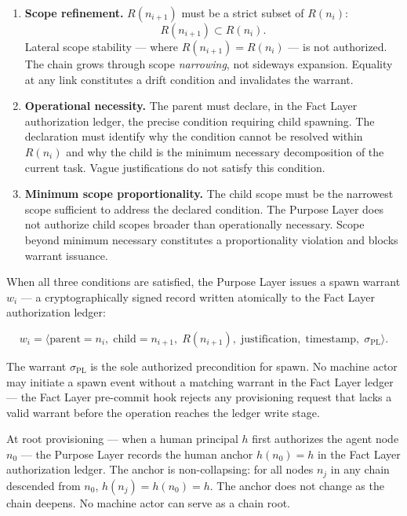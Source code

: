 \begin{enumerate}
    \item[(P1)] \textbf{Scope refinement.} $R(n_{i+1})$ must be a strict subset of $R(n_i)$:
    \begin{equation}
    R(n_{i+1}) \subset R(n_i).
    \label{eq:rs-scope-refinement}
    \end{equation}
    Lateral scope stability — where $R(n_{i+1}) = R(n_i)$ — is not authorized. The chain grows through scope \emph{narrowing}, not sideways expansion. Equality at any link constitutes a drift condition and invalidates the warrant.

    \item[(P2)] \textbf{Operational necessity.} The parent must declare, in the Fact Layer authorization ledger, the precise condition requiring child spawning. The declaration must identify why the condition cannot be resolved within $R(n_i)$ and why the child is the minimum necessary decomposition of the current task. Vague justifications do not satisfy this condition.

    \item[(P3)] \textbf{Minimum scope proportionality.} The child scope must be the narrowest scope sufficient to address the declared condition. The Purpose Layer does not authorize child scopes broader than operationally necessary. Scope beyond minimum necessary constitutes a proportionality violation and blocks warrant issuance.
\end{enumerate}

When all three conditions are satisfied, the Purpose Layer issues a spawn warrant $w_i$ — a cryptographically signed record written atomically to the Fact Layer authorization ledger:

\begin{equation}
w_i = \bigl\langle
\text{parent}=n_i,\;
\text{child}=n_{i+1},\;
R(n_{i+1}),\;
\text{justification},\;
\text{timestamp},\;
\sigma_{\text{PL}}
\bigr\rangle .
\label{eq:spawn-warrant}
\end{equation}

The warrant $\sigma_{\text{PL}}$ is the sole authorized precondition for spawn. No machine actor may initiate a spawn event without a matching warrant in the Fact Layer ledger — the Fact Layer pre-commit hook rejects any provisioning request that lacks a valid warrant before the operation reaches the ledger write stage.

At root provisioning — when a human principal $h$ first authorizes the agent node $n_0$ — the Purpose Layer records the human anchor $h(n_0) = h$ in the Fact Layer authorization ledger. The anchor is non-collapsing: for all nodes $n_j$ in any chain descended from $n_0$, $h(n_j) = h(n_0) = h$. The anchor does not change as the chain deepens. No machine actor can serve as a chain root.

